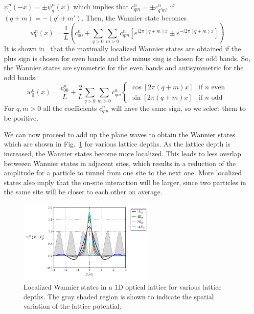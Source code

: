 \documentclass[11pt,letter]{article}
\begin{document}
$\psi_{q}^{n}(-x) = \pm \psi_{q}^{n}(x)$ which implies that $c_{qm}^{n} = \pm
c_{q'm'}^{n}$ if  $(q+m) = -(q'+m')$.  Then, the Wannier state becomes
\begin{equation}
  w_{0}^{n}(x)= 
    \frac{1}{L} \left(
   c_{00}^{n} + 
    \sum_{q>0} 
   \sum_{m > 0 } 
   c_{qm}^{n} \left[ e^{i 2\pi(q+m)x} \pm e^{-i 2\pi(q+m)x } \right] \right)
\end{equation}
It is shown in~\cite{Kohn1959} that the maximally localized Wannier states are
obtained if the plus sign is chosen for even bands and the minus sing is chosen
for odd bands.  So, the Wannier states are symmetric for the even bands and
antisymmetric for the odd bands.  \begin{equation}
  w_{0}^{n}(x)= 
    \frac{c_{00}^{n}}{L}
   + 
    \frac{2}{L}
    \sum_{q>0} 
   \sum_{m > 0 } 
   c_{qm}^{n} 
\begin{cases}
\cos[ 2\pi(q+m)x ] & \text{if $n$ even} \\
\sin[ 2\pi(q+m)x ] & \text{if $n$ odd }
\end{cases}
\end{equation}
For $q,m>0$ all the coefficients $c_{qm}^{n}$ will have the same sign, so we
select them to be positive.  

We can now proceed to add up the plane waves to  obtain the Wannier states
which are shown in Fig.~\ref{fig:wannier1d_V0} for various lattice depths.   As
the lattice depth is increased, the Wannier states become more localized.  This
leads to less overlap betweeen Wannier states in adjacent sites, which results
in a reduction of the amplitude for a particle to tunnel from one site to the
next one.   More localized states also imply that the on-site interaction will
be larger, since two particles in the same site will be closer to each other on
average. 
\begin{figure}
\centering \includegraphics[width=0.6\textwidth]{../BandStructure_figures/wannier1d_V0.pdf}
\caption[Wannier states in 1D lattice for various lattice depths.]{\small
Localized Wannier states in a 1D optical lattice for various lattice depths.
The gray shaded region is shown to  indicate the spatial variation of the
lattice potential.
} \label{fig:wannier1d_V0}
\end{figure}
\end{document}

